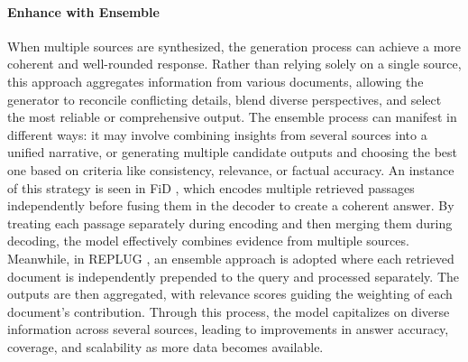 \paragraph{Enhance with Ensemble}
When multiple sources are synthesized, the generation process can achieve a more coherent and well-rounded response. Rather than relying solely on a single source, this approach aggregates information from various documents, allowing the generator to reconcile conflicting details, blend diverse perspectives, and select the most reliable or comprehensive output. The ensemble process can manifest in different ways: it may involve combining insights from several sources into a unified narrative, or generating multiple candidate outputs and choosing the best one based on criteria like consistency, relevance, or factual accuracy. An instance of this strategy is seen in FiD \cite{izacard2021leveraging}, which encodes multiple retrieved passages independently before fusing them in the decoder to create a coherent answer. By treating each passage separately during encoding and then merging them during decoding, the model effectively combines evidence from multiple sources. Meanwhile, in REPLUG \cite{shi2023replug}, an ensemble approach is adopted where each retrieved document is independently prepended to the query and processed separately. The outputs are then aggregated, with relevance scores guiding the weighting of each document’s contribution. Through this process, the model capitalizes on diverse information across several sources, leading to improvements in answer accuracy, coverage, and scalability as more data becomes available.

